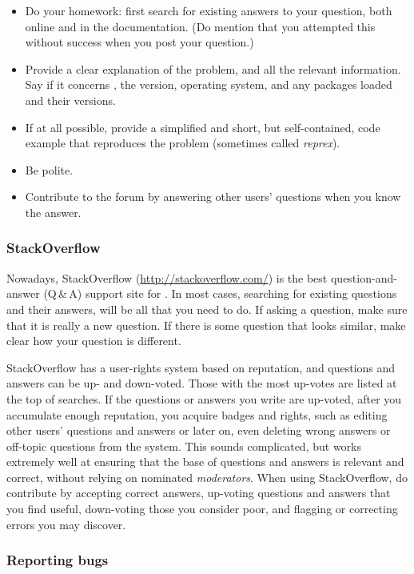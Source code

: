 \documentclass[krantz2]{krantz}\usepackage{knitr}
\begin{document}
\begin{itemize}
  \item Do your homework: first search for existing answers to your question, both online and in the documentation. (Do mention that you attempted this without success when you post your question.)
  \item Provide a clear explanation of the problem, and all the relevant information. Say if it concerns \Rpgrm, the version, operating system, and any packages loaded and their versions.
  \item If at all possible, provide a simplified and short, but self-contained, code example that reproduces the problem (sometimes called \emph{reprex}).
  \item Be polite.
  \item Contribute to the forum by answering other users' questions when you know the answer.
\end{itemize}

\subsubsection{StackOverflow}

Nowadays, StackOverflow (\url{http://stackoverflow.com/}) is the best question-and-answer (Q\,\&\,A) support site for \Rpgrm. In most cases, searching for existing questions and their answers, will be all that you need to do. If asking a question, make sure that it is really a new question. If there is some question that looks similar, make clear how your question is different.

StackOverflow has a user-rights system based on reputation, and questions and answers can be up- and down-voted. Those with the most up-votes are listed at the top of searches. If the questions or answers you write are up-voted, after you accumulate enough reputation, you acquire badges and rights, such as editing other users' questions and answers or later on, even deleting wrong answers or off-topic questions from the system. This sounds complicated, but works extremely well at ensuring that the base of questions and answers is relevant and correct, without relying on nominated \emph{moderators}. When using StackOverflow, do contribute by accepting correct answers, up-voting questions and answers that you find useful, down-voting those you consider poor, and flagging or correcting errors you may discover.

\subsubsection{Reporting bugs}
\end{document}
